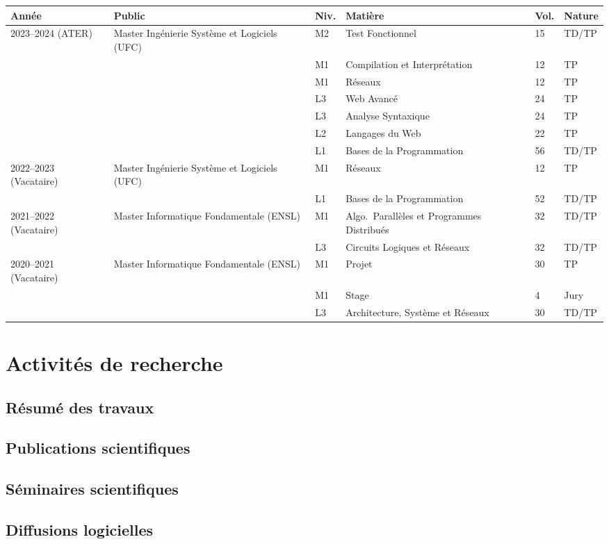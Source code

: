 \documentclass[12pt]{article}
\begin{document}
\begin{center}
	\footnotesize
	\begin{tabularx}{\linewidth}{p{2cm}p{3.5cm}lXll}
		\toprule
		Année & Public & Niv. & Matière & Vol. & Nature \tabularnewline
		\midrule
		2023--2024 (ATER) & Master Ingénierie Système et Logiciels (UFC) & M2 & Test Fonctionnel & 15 & TD/TP \tabularnewline
		& & M1 & Compilation et Interprétation & 12 & TP \tabularnewline
		& & M1 & Réseaux & 12 & TP \tabularnewline
		& & L3 & Web Avancé & 24 & TP \tabularnewline
		& & L3 & Analyse Syntaxique & 24 & TP \tabularnewline
		& & L2 & Langages du Web & 22 & TP \tabularnewline
		& & L1 & Bases de la Programmation & 56 & TD/TP \tabularnewline
		\midrule
		2022--2023 (Vacataire) & Master Ingénierie Système et Logiciels (UFC) & M1 & Réseaux & 12 & TP \tabularnewline
		& & L1 & Bases de la Programmation & 52 & TD/TP \tabularnewline
		\midrule
		2021--2022 (Vacataire) & Master Informatique Fondamentale (ENSL) & M1 & Algo.\ Parallèles et Programmes Distribués & 32 & TD/TP \tabularnewline
		& & L3 & Circuits Logiques et Réseaux & 32 & TD/TP \tabularnewline
		\midrule
		2020--2021 (Vacataire) & Master Informatique Fondamentale (ENSL) & M1 & Projet & 30 & TP \tabularnewline
		& & M1 & Stage & 4 & Jury \tabularnewline
		& & L3 & Architecture, Système et Réseaux & 30 & TD/TP \tabularnewline
		\bottomrule
	\end{tabularx}
\end{center}

\section{Activités de recherche}

\subsection{Résumé des travaux}

\subsection{Publications scientifiques}

\subsection{Séminaires scientifiques}

\subsection{Diffusions logicielles}
\end{document}
